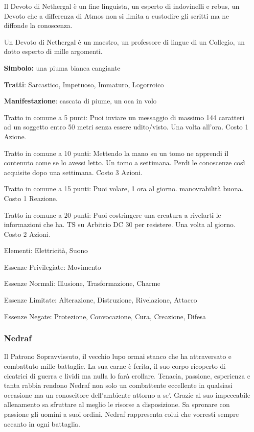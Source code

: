 \documentclass[a4paper,11pt,twoside,openany]{book}
\begin{document}
Il Devoto di Nethergal è un fine linguista, un esperto di indovinelli e rebus, un Devoto che a differenza di Atmos non si limita a custodire gli scritti ma ne diffonde la conoscenza.

Un Devoto di Nethergal è un maestro, un professore di lingue di un Collegio, un dotto esperto di mille argomenti.

\textbf{Simbolo:} una piuma bianca cangiante

\textbf{Tratti}: Sarcastico, Impetuoso, Immaturo, Logorroico

\textbf{Manifestazione}: cascata di piume, un oca in volo

\bigskip

Tratto in comune a 5 punti: Puoi inviare un messaggio di massimo 144 caratteri ad un soggetto entro 50 metri senza essere udito/visto. Una volta all'ora. Costo 1 Azione.

Tratto in comune a 10 punti: Mettendo la mano su un tomo ne apprendi il contenuto come se lo avessi letto. Un tomo a settimana. Perdi le conoscenze così acquisite dopo una settimana. Costo 3 Azioni.

Tratto in comune a 15 punti: Puoi volare, 1 ora al giorno. manovrabilità buona. Costo 1 Reazione.

Tratto in comune a 20 punti: Puoi costringere una creatura a rivelarti le informazioni che ha. TS su Arbitrio DC 30 per resistere. Una volta al giorno. Costo 2 Azioni.

\bigskip

Elementi: Elettricità, Suono

\bigskip

Essenze Privilegiate: Movimento

Essenze Normali: Illusione, Trasformazione, Charme

Essenze Limitate: Alterazione, Distruzione, Rivelazione, Attacco

Essenze Negate: Protezione, Convocazione, Cura, Creazione, Difesa

\subsubsection{Nedraf}

\label{nedraf}

Il Patrono Sopravvissuto, il vecchio lupo ormai stanco che ha attraversato e combattuto mille battaglie. La sua carne è ferita, il suo corpo ricoperto di cicatrici di guerra e lividi ma nulla lo farà crollare. Tenacia, passione, esperienza e tanta rabbia rendono Nedraf non solo un combattente eccellente in qualsiasi occasione ma un conoscitore dell'ambiente attorno a se'. Grazie al suo impeccabile allenamento sa sfruttare al meglio le risorse a disposizione. Sa spronare con passione gli uomini a suoi ordini.
Nedraf rappresenta colui che vorresti sempre accanto in ogni battaglia.
\end{document}
